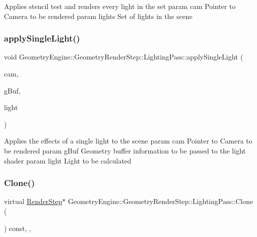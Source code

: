 Applies stencil test and renders every light in the set param cam Pointer to Camera to be rendered param lights Set of lights in the scene \mbox{\label{class_geometry_engine_1_1_geometry_render_step_1_1_lighting_pass_ae55cc29215ac54a526d9107f4e1f2803}} 
\subsubsection{\texorpdfstring{applySingleLight()}{applySingleLight()}}
{\footnotesize\ttfamily void Geometry\+Engine\+::\+Geometry\+Render\+Step\+::\+Lighting\+Pass\+::apply\+Single\+Light (\begin{DoxyParamCaption}\item[{\mbox{\hyperlink{class_geometry_engine_1_1_geometry_world_item_1_1_geometry_camera_1_1_camera}{Geometry\+World\+Item\+::\+Geometry\+Camera\+::\+Camera}} $\ast$}]{cam,  }\item[{const \mbox{\hyperlink{struct_geometry_engine_1_1_g_buffer_texture_info}{G\+Buffer\+Texture\+Info}} \&}]{g\+Buf,  }\item[{\mbox{\hyperlink{class_geometry_engine_1_1_geometry_world_item_1_1_geometry_light_1_1_light}{Geometry\+World\+Item\+::\+Geometry\+Light\+::\+Light}} $\ast$}]{light }\end{DoxyParamCaption})\hspace{0.3cm}{\ttfamily [protected]}}

Applies the effects of a single light to the scene param cam Pointer to Camera to be rendered param g\+Buf Geometry buffer information to be passed to the light shader param light Light to be calculated \mbox{\label{class_geometry_engine_1_1_geometry_render_step_1_1_lighting_pass_a4f1cb36c7bf6a90d0aa3b8e8feba5e5e}} 
\subsubsection{\texorpdfstring{Clone()}{Clone()}}
{\footnotesize\ttfamily virtual \mbox{\hyperlink{class_geometry_engine_1_1_geometry_render_step_1_1_render_step}{Render\+Step}}$\ast$ Geometry\+Engine\+::\+Geometry\+Render\+Step\+::\+Lighting\+Pass\+::\+Clone (\begin{DoxyParamCaption}{ }\end{DoxyParamCaption}) const\hspace{0.3cm}{\ttfamily [inline]}, {\ttfamily [override]}, {\ttfamily [virtual]}}

